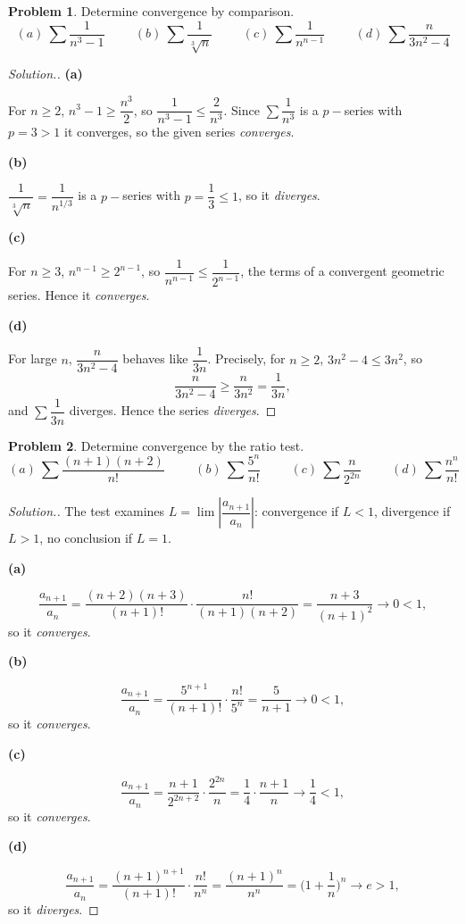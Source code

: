 \documentclass[11pt,a4paper]{article}
\theoremstyle{definition}
\newtheorem{problemx}{Problem}[subsection]
\newenvironment{problem}{\begin{problemx}}{\end{problemx}}
\newenvironment{solution}
  {\renewcommand{\qedsymbol}{}\begin{proof}[\textit{Solution}.]}
  {\end{proof}}
\newcommand{\subhead}[1]{%
  \par\medskip\noindent\textbf{#1}\par\nobreak\smallskip}
\begin{document}
\begin{problem}
Determine convergence by comparison.
$$(a)\ \sum\frac{1}{n^3-1}\hspace{1cm}(b)\ \sum\frac{1}{\sqrt[3]{n}}
\hspace{1cm}(c)\ \sum\frac{1}{n^{n-1}}\hspace{1cm}(d)\ \sum\frac{n}{3n^2-4}$$
\end{problem}
\begin{solution}
\subhead{(a)}
For $n\geq 2$, $n^3 - 1 \geq \dfrac{n^3}{2}$, so
$\dfrac{1}{n^3-1}\leq\dfrac{2}{n^3}$. Since $\sum\dfrac{1}{n^3}$ is a
$p-$series with $p = 3 > 1$ it converges, so the given series
\emph{converges}.

\subhead{(b)}
$\dfrac{1}{\sqrt[3]{n}} = \dfrac{1}{n^{1/3}}$ is a $p-$series with
$p = \dfrac13 \leq 1$, so it \emph{diverges}.

\subhead{(c)}
For $n\geq 3$, $n^{n-1}\geq 2^{n-1}$, so
$\dfrac{1}{n^{n-1}}\leq\dfrac{1}{2^{n-1}}$, the terms of a convergent geometric
series. Hence it \emph{converges}.

\subhead{(d)}
For large $n$, $\dfrac{n}{3n^2-4}$ behaves like $\dfrac{1}{3n}$. Precisely, for
$n\geq 2$, $3n^2 - 4 \leq 3n^2$, so
$$\frac{n}{3n^2-4} \geq \frac{n}{3n^2} = \frac{1}{3n},$$
and $\sum\dfrac{1}{3n}$ diverges. Hence the series \emph{diverges}.
\end{solution}

\begin{problem}
Determine convergence by the ratio test.
$$(a)\ \sum\frac{(n+1)(n+2)}{n!}\hspace{1cm}(b)\ \sum\frac{5^n}{n!}
\hspace{1cm}(c)\ \sum\frac{n}{2^{2n}}\hspace{1cm}(d)\ \sum\frac{n^n}{n!}$$
\end{problem}
\begin{solution}
The test examines $L = \lim\left|\dfrac{a_{n+1}}{a_n}\right|$: convergence if
$L<1$, divergence if $L>1$, no conclusion if $L=1$.

\subhead{(a)}
$$\frac{a_{n+1}}{a_n} = \frac{(n+2)(n+3)}{(n+1)!}\cdot\frac{n!}{(n+1)(n+2)}
= \frac{n+3}{(n+1)^2}\longrightarrow 0 < 1 ,$$
so it \emph{converges}.

\subhead{(b)}
$$\frac{a_{n+1}}{a_n} = \frac{5^{n+1}}{(n+1)!}\cdot\frac{n!}{5^n}
= \frac{5}{n+1}\longrightarrow 0 < 1 ,$$
so it \emph{converges}.

\subhead{(c)}
$$\frac{a_{n+1}}{a_n} = \frac{n+1}{2^{2n+2}}\cdot\frac{2^{2n}}{n}
= \frac{1}{4}\cdot\frac{n+1}{n}\longrightarrow \frac14 < 1 ,$$
so it \emph{converges}.

\subhead{(d)}
$$\frac{a_{n+1}}{a_n} = \frac{(n+1)^{n+1}}{(n+1)!}\cdot\frac{n!}{n^n}
= \frac{(n+1)^n}{n^n} = \Big(1+\frac1n\Big)^n\longrightarrow e > 1 ,$$
so it \emph{diverges}.
\end{solution}
\end{document}
